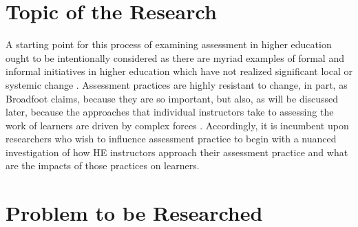 \documentclass[
]{book}
\begin{document}
\hypertarget{topic-of-the-research}{%
\section{Topic of the Research}\label{topic-of-the-research}}

A starting point for this process of examining assessment in higher education ought to be intentionally considered as there are myriad examples of formal and informal initiatives in higher education which have not realized significant local or systemic change \citep{broadfootAssessmentTwentyFirstCenturyLearning2016, earlAssessmentLearningUsing2013}. Assessment practices are highly resistant to change, in part, as Broadfoot claims, because they are so important, but also, as will be discussed later, because the approaches that individual instructors take to assessing the work of learners are driven by complex forces \citep{blackAssessmentClassroomLearning1998, delucaDifferentialSituatedView2019, stigginsAssessmentLiteracy1991, willisConceptualisingTeachersAssessment2013}. Accordingly, it is incumbent upon researchers who wish to influence assessment practice to begin with a nuanced investigation of how HE instructors approach their assessment practice and what are the impacts of those practices on learners.

\hypertarget{problem-to-be-researched}{%
\section{Problem to be Researched}\label{problem-to-be-researched}}
\end{document}
